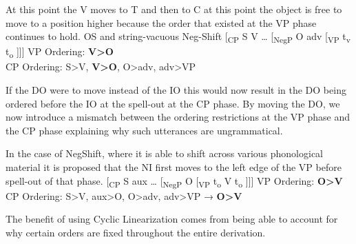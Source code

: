 \documentclass[12pt, letterpaper]{article}
\begin{document}
\ex At this point the V moves to T and then to C at this point the object is free to move to a position higher because the order that existed at the VP phase continues to hold. 
\ex OS and string-vacuous Neg-Shift
 	\ea {}[\textsubscript{CP} S V … [\textsubscript{NegP} O adv [\textsubscript{VP} t\textsubscript{v} t\textsubscript{o} ]]]
	\vspace{6pt}
	\ex VP Ordering: \textbf{V>O}\\
		CP Ordering: S>V, \textbf{V>O}, O>adv, adv>VP
	\z

\ex If the DO were to move instead of the IO this would now result in the DO being ordered before the IO at the spell-out at the CP phase. By moving the DO, we now introduce a mismatch between the ordering restrictions at the VP phase and the CP phase explaining why such utterances are ungrammatical. 

\ex In the case of NegShift, where it is able to shift across various phonological material it is proposed that the NI first moves to the left edge of the VP before spell-out of that phase. 
\vspace{6pt}
	\ea {}[\textsubscript{CP} S aux … [\textsubscript{NegP} O [\textsubscript{VP} t\textsubscript{o}  V t\textsubscript{o} ]]]
	\ex VP Ordering: \textbf{O>V}\\
	CP Ordering: S>V, aux>O, O>adv, adv>VP → \textbf{O>V}
	\z

\ex The benefit of using Cyclic Linearization comes from being able to account for why certain orders are fixed throughout the entire derivation.
\z 


\end{document}
